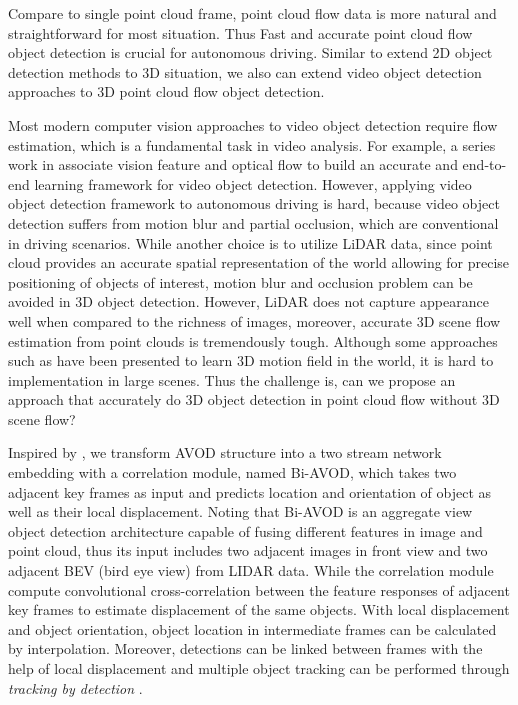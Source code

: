 \documentclass{bmvc2k}
\begin{document}
Compare to single point cloud frame, point cloud flow data is more natural and straightforward for most situation. Thus Fast and accurate point cloud flow object detection is crucial for autonomous driving. Similar to extend 2D object detection methods to 3D situation, we also can extend video object detection approaches to 3D point cloud flow object detection. 

Most modern computer vision approaches to video object detection require flow estimation, which is a fundamental task in video analysis. For example, a series work in \cite{zhu2017flow,zhu2018towards} associate vision feature and optical flow to build an accurate and end-to-end learning framework for video object detection. However, applying video object detection framework to autonomous driving is hard, because video object detection suffers from motion blur and partial occlusion, which are conventional in driving scenarios. While another choice is to utilize LiDAR data, since point cloud provides an accurate spatial representation of the world allowing for precise positioning of objects of interest, motion blur and occlusion problem can be avoided in 3D object detection. However, LiDAR does not capture appearance well when compared to the richness of images, moreover, accurate 3D scene flow estimation from point clouds is tremendously tough. Although some approaches such as \cite{liu2018learning, behl2018pointflownet} have been presented to learn 3D motion field in the world, it is hard to implementation in large scenes. Thus the challenge is, can we propose an approach that accurately do 3D object detection in point cloud flow without 3D scene flow?

Inspired by \cite{feichtenhofer2017detect}, we transform AVOD \cite{ku2018joint} structure into 
a two stream network embedding with a correlation module, named Bi-AVOD, which takes two adjacent key frames as input and predicts location and orientation of object as well as their local displacement. Noting that Bi-AVOD is an aggregate view object detection architecture capable of fusing different features in image and point cloud, thus its input includes two adjacent images in front view and two adjacent BEV (bird eye view) from LIDAR data. While the correlation module compute convolutional cross-correlation between the feature responses of adjacent key frames to estimate displacement of the same objects. With local displacement and object orientation, object location in intermediate frames can be calculated by interpolation. Moreover, detections can be linked between frames with the help of local displacement and multiple object tracking can be performed through \textit{tracking by detection} \cite{lenz2015followme}. 
\end{document}
